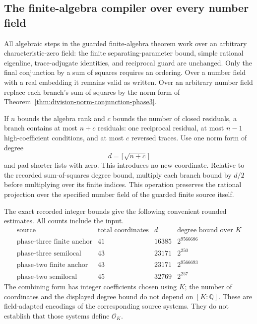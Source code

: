 \subsection{The finite-algebra compiler over every number field}

All algebraic steps in the guarded finite-algebra theorem work
over an arbitrary characteristic-zero field: the finite
separating-parameter bound, simple rational eigenline,
trace-adjugate identities, and reciprocal guard are unchanged.
Only the final conjunction by a sum of squares requires an
ordering.  Over a number field with a real embedding it remains
valid as written.  Over an arbitrary number field replace each
branch's sum of squares by the norm form of
Theorem~\ref{thm:division-norm-conjunction-phase3}.

If $n$ bounds the algebra rank and $c$ bounds the number of
closed residuals, a branch contains at most $n+c$ residuals:
one reciprocal residual, at most $n-1$ high-coefficient
conditions, and at most $c$ reversed traces.  Use one norm form
of degree
\[
                         d=\lceil\sqrt{n+c}\rceil
\]
and pad shorter lists with zero.  This introduces no new
coordinate.  Relative to the recorded sum-of-squares degree
bound, multiply each branch bound by $d/2$ before multiplying
over its finite indices.  This operation preserves the rational
projection over the specified number field of the guarded
finite source itself.

The exact recorded integer bounds give the following convenient
rounded estimates.  All counts include the input.
\[
\begin{array}{c|c|r|c}
\text{source}&\text{total coordinates}&d&\text{degree bound over }K\\\hline
\text{phase-three finite anchor}&41&16385&2^{9566686}\\
\text{phase-three semilocal}&43&23171&2^{250}\\
\text{phase-two finite anchor}&43&23171&2^{9566693}\\
\text{phase-two semilocal}&45&32769&2^{257}
\end{array}
\]
The combining form has integer coefficients chosen using $K$;
the number of coordinates and the displayed degree bound do not
depend on $[K:\mathbb Q]$.  These are field-adapted encodings
of the corresponding source systems.  They do not establish
that those systems define $\mathcal O_K$.
